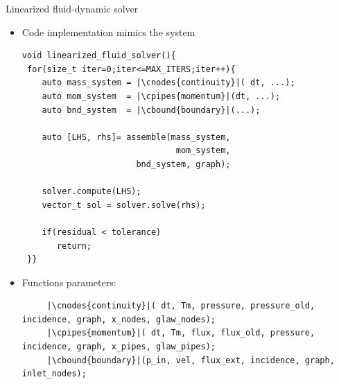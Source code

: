 \begin{frame}[fragile]{Linearized fluid-dynamic solver}

\begin{itemize}
    \item Code implementation mimics the system

\begin{minipage}{0.43\textwidth}
\begin{verbatim}
void linearized_fluid_solver(){
 for(size_t iter=0;iter<=MAX_ITERS;iter++){    
    auto mass_system = |\cnodes{continuity}|( dt, ...);
    auto mom_system  = |\cpipes{momentum}|(dt, ...);
    auto bnd_system  = |\cbound{boundary}|(...);
        
    auto [LHS, rhs]= assemble(mass_system,
                               mom_system,
                       bnd_system, graph);

    solver.compute(LHS);
    vector_t sol = solver.solve(rhs);

    if(residual < tolerance)
       return;
 }}
\end{verbatim}
\end{minipage}%
\hfill
\begin{minipage}{0.45\textwidth}
    
\end{minipage}

\item Functions parameters:
\begin{verbatim}
     |\cnodes{continuity}|( dt, Tm, pressure, pressure_old, incidence, graph, x_nodes, glaw_nodes);
     |\cpipes{momentum}|( dt, Tm, flux, flux_old, pressure, incidence, graph, x_pipes, glaw_pipes);
     |\cbound{boundary}|(p_in, vel, flux_ext, incidence, graph, inlet_nodes);
\end{verbatim}
\end{itemize}
\end{frame}
